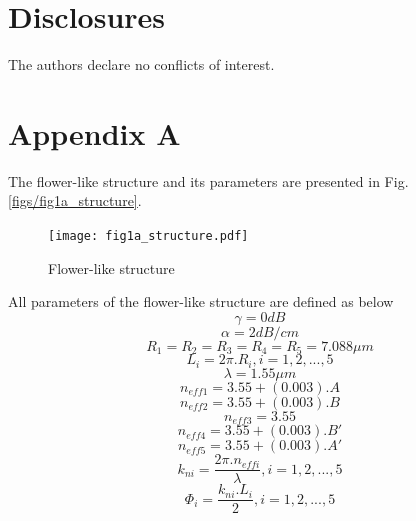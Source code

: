 \documentclass{osa-article}
\begin{document}
\section*{Disclosures}
The authors declare no conflicts of interest.

\appendix
\section*{Appendix A}
\label{Appendix A}
The flower-like structure and its parameters are presented in Fig.\ref{figs/fig1a_structure}.
   \begin{figure}[tb]
\centering
\texttt{[image: fig1a\_structure.pdf]}
	\caption{Flower-like structure}
	\label{fig1a_structure}
\end{figure}
All parameters of the flower-like structure are defined as below\\
 \begin{equation}
\gamma=0 dB
\label{eqa1}
\end{equation}
 \begin{equation}
\alpha=2 dB/cm
\label{eqa2}
\end{equation}
 \begin{equation}
R_1=R_2=R_3=R_4=R_5=7.088 {\mu}m
\label{eqa3}
\end{equation}
 \begin{equation}
L_i=2{\pi}.{R_i}, i=1, 2,..., 5
\label{eqa4}
\end{equation}
 \begin{equation}
\lambda=1.55{\mu}m
\label{eqa5}
\end{equation}
 \begin{equation}
n_{eff1}=3.55+(0.003).A
\label{eqa6}
\end{equation}
 \begin{equation}
n_{eff2}=3.55+(0.003).B
\label{eqa7}
\end{equation}
 \begin{equation}
n_{eff3}=3.55
\label{eqa8}
\end{equation}
 \begin{equation}
n_{eff4}=3.55+(0.003). B'
\label{eqa9}
\end{equation}
 \begin{equation}
n_{eff5}=3.55+(0.003). A'
\label{eqa10}
\end{equation}
 \begin{equation}
k_{ni}=\frac{2{\pi}.n_{effi}}{\lambda}, i=1, 2, ..., 5
\label{eqa11}
\end{equation}
 \begin{equation}
\Phi_{i}=\frac{k_{ni}.L_{i}}{2}, i=1, 2, ..., 5
\label{eqa12}
\end{equation}
\end{document}
